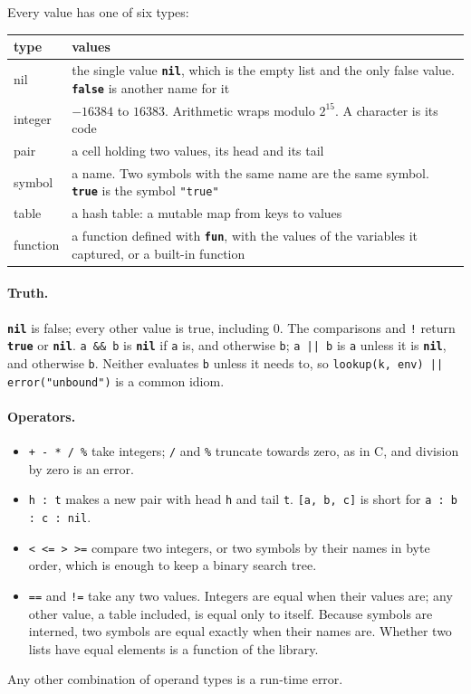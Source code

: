 \documentclass[11pt,a4paper]{article}
\newcommand{\kw}[1]{\textbf{\texttt{#1}}}
\begin{document}
Every value has one of six types:

\begin{center}
\small
\begin{tabularx}{\linewidth}{@{}l X@{}}
\toprule
type & values\\
\midrule
nil & the single value \kw{nil}, which is the empty list and the only false
  value. \kw{false} is another name for it\\
integer & $-16384$ to $16383$. Arithmetic wraps modulo $2^{15}$. A character
  is its code\\
pair & a cell holding two values, its head and its tail\\
symbol & a name. Two symbols with the same name are the same symbol.
  \kw{true} is the symbol \texttt{"true"}\\
table & a hash table: a mutable map from keys to values\\
function & a function defined with \kw{fun}, with the values of the
  variables it captured, or a built-in function\\
\bottomrule
\end{tabularx}
\end{center}

\paragraph{Truth.} \kw{nil} is false; every other value is true, including
0. The comparisons and \verb|!| return \kw{true} or \kw{nil}.
\verb|a && b| is \kw{nil} if \verb|a| is, and otherwise \verb|b|;
\verb!a || b! is \verb|a| unless it is \kw{nil}, and otherwise \verb|b|.
Neither evaluates \verb|b| unless it needs to, so
\verb!lookup(k, env) || error("unbound")! is a common idiom.

\paragraph{Operators.}
\begin{itemize}[nosep]
\item \verb|+ - * / %| take integers; \verb|/| and \verb|%| truncate towards
  zero, as in C, and division by zero is an error.
\item \verb|h : t| makes a new pair with head \verb|h| and tail \verb|t|.
  \verb|[a, b, c]| is short for \verb|a : b : c : nil|.
\item \verb|< <= > >=| compare two integers, or two symbols by their names
  in byte order, which is enough to keep a binary search tree.
\item \verb|==| and \verb|!=| take any two values. Integers are equal when
  their values are; any other value, a table included, is equal only to
  itself. Because
  symbols are interned, two symbols are equal exactly when their names are.
  Whether two lists have equal elements is a function of the library.
\end{itemize}
Any other combination of operand types is a run-time error.
\end{document}
